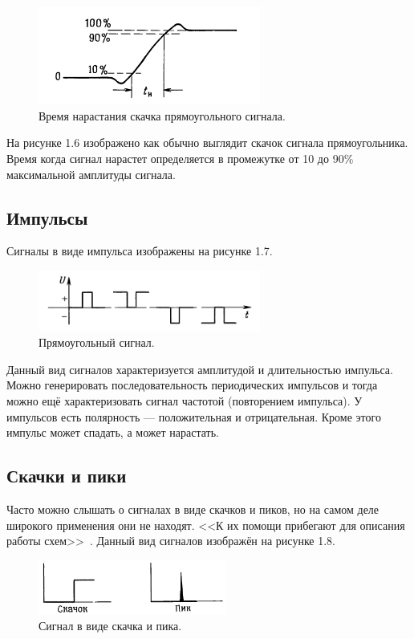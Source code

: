 	\begin{figure}[H]
    \centering
    \includegraphics[width=0.65\textwidth]{../image/s_p_t.png}
    \caption{Время нарастания скачка прямоугольного сигнала.}
	\end{figure}
	
На рисунке 1.6 изображено как обычно выглядит скачок сигнала прямоугольника. Время когда сигнал нарастет определяется в промежутке от 10 до 90\% максимальной амплитуды сигнала.

\subsection{Импульсы}
Сигналы в виде импульса изображены на рисунке 1.7.

	\begin{figure}[H]
    \centering
    \includegraphics[width=0.65\textwidth]{../image/s_i.png}
    \caption{Прямоугольный сигнал.}
	\end{figure}
	
Данный вид сигналов характеризуется амплитудой и длительностью импульса. Можно генерировать последовательность периодических импульсов и тогда можно ещё характеризовать сигнал частотой (повторением импульса). У импульсов есть полярность --- положительная и отрицательная. Кроме этого импульс может спадать, а может нарастать. 
	


\subsection{Скачки и пики}
Часто можно слышать о сигналах в виде скачков и пиков, но на самом деле широкого применения они не находят. <<К их помощи прибегают для описания работы схем>>~\cite{is}. Данный вид сигналов изображён на рисунке 1.8.

	\begin{figure}[H]
    \centering
    \includegraphics[width=0.55\textwidth]{../image/s_sp.png}
    \caption{Сигнал в виде скачка и пика.}
	\end{figure}

